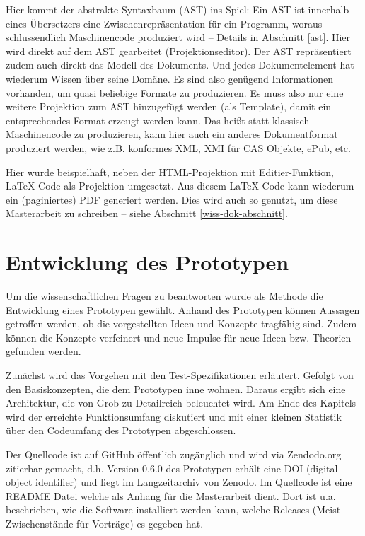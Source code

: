  
Hier kommt der abstrakte Syntaxbaum (AST) ins Spiel: Ein AST ist innerhalb eines Übersetzers eine Zwischenrepräsentation für ein Programm, woraus schlussendlich Maschinencode produziert wird -- Details in Abschnitt \ref{ast}. Hier wird direkt auf dem AST gearbeitet (Projektionseditor). Der AST repräsentiert zudem auch direkt das Modell des Dokuments. Und jedes Dokumentelement hat wiederum Wissen über seine Domäne. Es sind also genügend Informationen vorhanden, um quasi beliebige Formate zu produzieren. Es muss also nur eine weitere Projektion zum AST hinzugefügt werden (als Template), damit ein entsprechendes Format erzeugt werden kann. Das heißt statt klassisch Maschinencode zu produzieren, kann hier auch ein anderes Dokumentformat produziert werden, wie z.B. \citep{NISO} konformes XML, XMI für CAS Objekte, ePub, etc.

 
Hier wurde beispielhaft, neben der HTML-Projektion mit Editier-Funktion, LaTeX-Code als Projektion umgesetzt. Aus diesem LaTeX-Code kann wiederum ein (paginiertes) PDF generiert werden. Dies wird auch so genutzt, um diese Masterarbeit zu schreiben -- siehe Abschnitt \ref{wiss-dok-abschnitt}.

 
\chapter{Entwicklung des Prototypen}\label{}
 
Um die wissenschaftlichen Fragen zu beantworten wurde als Methode die Entwicklung eines Prototypen gewählt. Anhand des Prototypen können Aussagen getroffen werden, ob die vorgestellten Ideen und Konzepte tragfähig sind. Zudem können die Konzepte verfeinert und neue Impulse für neue Ideen bzw. Theorien gefunden werden.

 
Zunächst wird das Vorgehen mit den Test-Spezifikationen erläutert. Gefolgt von den Basiskonzepten, die dem Prototypen inne wohnen. Daraus ergibt sich eine Architektur, die von Grob zu Detailreich beleuchtet wird. Am Ende des Kapitels wird der erreichte Funktionsumfang diskutiert und mit einer kleinen Statistik über den Codeumfang des Prototypen abgeschlossen.

 
Der Quellcode \citep{HodappScaltex} ist auf GitHub öffentlich zugänglich und wird via Zendodo.org zitierbar gemacht, d.h. Version 0.6.0 des Prototypen erhält eine DOI (digital object identifier) und liegt im Langzeitarchiv von Zenodo. Im Quellcode ist eine README Datei welche als Anhang für die Masterarbeit dient. Dort ist u.a. beschrieben, wie die Software installiert werden kann, welche Releases (Meist Zwischenstände für Vorträge) es gegeben hat.

